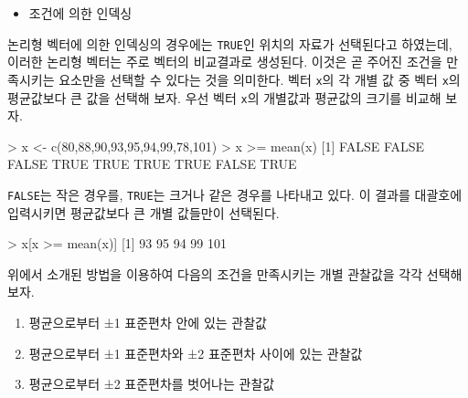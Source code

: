 \documentclass[
]{book}
\newenvironment{Shaded}{\begin{snugshade}}{\end{snugshade}}
\newcommand{\ConstantTok}[1]{\textcolor[rgb]{0.00,0.00,0.00}{#1}}
\newcommand{\DecValTok}[1]{\textcolor[rgb]{0.00,0.00,0.81}{#1}}
\newcommand{\FunctionTok}[1]{\textcolor[rgb]{0.00,0.00,0.00}{#1}}
\newcommand{\NormalTok}[1]{#1}
\newcommand{\OtherTok}[1]{\textcolor[rgb]{0.56,0.35,0.01}{#1}}
\newcommand{\SpecialCharTok}[1]{\textcolor[rgb]{0.00,0.00,0.00}{#1}}
\providecommand{\tightlist}{%
  \setlength{\itemsep}{0pt}\setlength{\parskip}{0pt}}
\begin{document}
\begin{itemize}
\tightlist
\item
  조건에 의한 인덱싱
\end{itemize}

논리형 벡터에 의한 인덱싱의 경우에는 \texttt{TRUE}인 위치의 자료가 선택된다고 하였는데,
이러한 논리형 벡터는 주로 벡터의 비교결과로 생성된다.
이것은 곧 주어진 조건을 만족시키는 요소만을 선택할 수 있다는 것을 의미한다.
벡터 \texttt{x}의 각 개별 값 중 벡터 \texttt{x}의 평균값보다 큰 값을 선택해 보자.
우선 벡터 \texttt{x}의 개별값과 평균값의 크기를 비교해 보자.

\begin{Shaded}
\begin{Highlighting}[]
\SpecialCharTok{\textgreater{}}\NormalTok{ x }\OtherTok{\textless{}{-}} \FunctionTok{c}\NormalTok{(}\DecValTok{80}\NormalTok{,}\DecValTok{88}\NormalTok{,}\DecValTok{90}\NormalTok{,}\DecValTok{93}\NormalTok{,}\DecValTok{95}\NormalTok{,}\DecValTok{94}\NormalTok{,}\DecValTok{99}\NormalTok{,}\DecValTok{78}\NormalTok{,}\DecValTok{101}\NormalTok{)}
\SpecialCharTok{\textgreater{}}\NormalTok{ x }\SpecialCharTok{\textgreater{}=} \FunctionTok{mean}\NormalTok{(x)}
\NormalTok{[}\DecValTok{1}\NormalTok{] }\ConstantTok{FALSE} \ConstantTok{FALSE} \ConstantTok{FALSE}  \ConstantTok{TRUE}  \ConstantTok{TRUE}  \ConstantTok{TRUE}  \ConstantTok{TRUE} \ConstantTok{FALSE}  \ConstantTok{TRUE}
\end{Highlighting}
\end{Shaded}

\texttt{FALSE}는 작은 경우를, \texttt{TRUE}는 크거나 같은 경우를 나타내고 있다. 이 결과를 대괄호에
입력시키면 평균값보다 큰 개별 값들만이 선택된다.

\begin{Shaded}
\begin{Highlighting}[]
\SpecialCharTok{\textgreater{}}\NormalTok{ x[x }\SpecialCharTok{\textgreater{}=} \FunctionTok{mean}\NormalTok{(x)]}
\NormalTok{[}\DecValTok{1}\NormalTok{]  }\DecValTok{93}  \DecValTok{95}  \DecValTok{94}  \DecValTok{99} \DecValTok{101}
\end{Highlighting}
\end{Shaded}

위에서 소개된 방법을 이용하여 다음의 조건을 만족시키는 개별 관찰값을 각각 선택해
보자.

\begin{enumerate}
\def\labelenumi{\arabic{enumi})}
\item
  평균으로부터 ±1 표준편차 안에 있는 관찰값
\item
  평균으로부터 ±1 표준편차와 ±2 표준편차 사이에 있는 관찰값
\item
  평균으로부터 ±2 표준편차를 벗어나는 관찰값
\end{enumerate}
\end{document}
